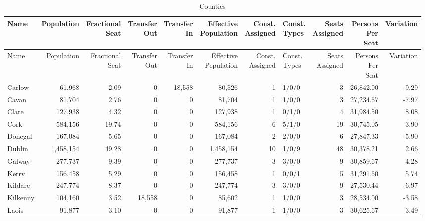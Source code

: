 \documentclass[a4paper]{article}
\begin{document}
\begin{longtable}{lrrrrrrlrrr}
\caption{Counties}
\\ \toprule
Name &Population &\shortstack{Fractional\\Seat} &\shortstack{Transfer\\Out} &\shortstack{Transfer\\In} &\shortstack{Effective\\Population} &\shortstack{Const.\\Assigned} &\shortstack{Const.\\Types} &\shortstack{Seats\\Assigned} &\shortstack{Persons\\Per\\Seat} &Variation \\ \midrule
\endfirsthead
\toprule
Name &Population &\shortstack{Fractional\\Seat} &\shortstack{Transfer\\Out} &\shortstack{Transfer\\In} &\shortstack{Effective\\Population} &\shortstack{Const.\\Assigned} &\shortstack{Const.\\Types} &\shortstack{Seats\\Assigned} &\shortstack{Persons\\Per\\Seat} &Variation \\ \midrule
\endhead
\bottomrule
\endfoot
Carlow&61,968& 2.09&0&18,558&80,526&1&1/0/0&3&26,842.00&-9.29\\ 
Cavan&81,704& 2.76&0&0&81,704&1&1/0/0&3&27,234.67&-7.97\\ 
Clare&127,938& 4.32&0&0&127,938&1&0/1/0&4&31,984.50& 8.08\\ 
Cork&584,156&19.74&0&0&584,156&6&5/1/0&19&30,745.05& 3.90\\ 
Donegal&167,084& 5.65&0&0&167,084&2&2/0/0&6&27,847.33&-5.90\\ 
Dublin&1,458,154&49.28&0&0&1,458,154&10&1/0/9&48&30,378.21& 2.66\\ 
Galway&277,737& 9.39&0&0&277,737&3&3/0/0&9&30,859.67& 4.28\\ 
Kerry&156,458& 5.29&0&0&156,458&1&0/0/1&5&31,291.60& 5.74\\ 
Kildare&247,774& 8.37&0&0&247,774&3&3/0/0&9&27,530.44&-6.97\\ 
Kilkenny&104,160& 3.52&18,558&0&85,602&1&1/0/0&3&28,534.00&-3.58\\ 
Laois&91,877& 3.10&0&0&91,877&1&1/0/0&3&30,625.67& 3.49\\ 

\end{longtable}
\end{document}
